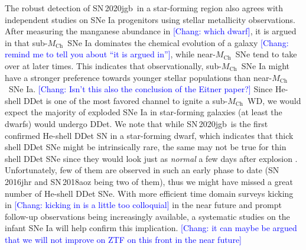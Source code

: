\documentclass[twocolumn]{aastex631}
\newcommand{\sn}{SN\,2020jgb}
\newcommand{\Mch}{$M_\mathrm{Ch}$}
\newcommand{\chang}[1]{\textcolor{blue}{[Chang: #1]}}
\begin{document}
The robust detection of \sn\ in a star-forming region also agrees with independent studies on SNe Ia progenitors using stellar metallicity observations. After measuring the manganese abundance in \chang{which dwarf}, it is argued in \citet{de_los_reyes_manganese_2020} that sub-\Mch\ SNe Ia dominates the chemical evolution of a galaxy \chang{remind me to tell you about ``it is argued in''}, while near-\Mch\ SNe tend to take over at later times. This indicates that observationally, sub-\Mch\ SNe Ia might have a stronger preference towards younger stellar populations than near-\Mch\ SNe Ia. \chang{Isn't this also the conclusion of the Eitner paper?} Since He-shell DDet is one of the most favored channel to ignite a sub-\Mch\ WD, we would expect the majority of exploded SNe Ia in star-forming galaxies (at least the dwarfs) would undergo DDet. We note that while \sn\ is the first confirmed He-shell DDet SN in a star-forming dwarf, which indicates that thick shell DDet SNe might be intrinsically rare, the same may not be true for thin shell DDet SNe since they would look just as {\it normal} a few days after explosion \citep{Ni_2022}. Unfortunately, few of them are observed in such an early phase to date (SN\,2016jhr and SN\,2018aoz being two of them), thus we might have missed a great number of He-shell DDet SNe. With more efficient time domain surveys kicking in \chang{kicking in is a little too colloquial} in the near future and prompt follow-up observations being increasingly available, a systematic studies on the infant SNe Ia will help confirm this implication. \chang{it can maybe be argued that we will not improve on ZTF on this front in the near future}
\end{document}
